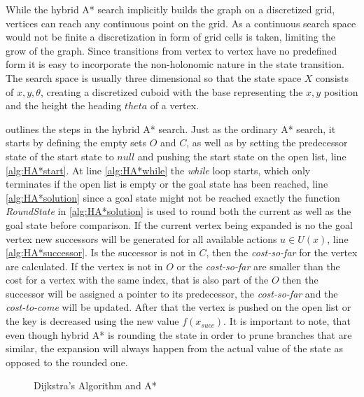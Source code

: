 While the hybrid A* search implicitly builds the graph on a discretized grid, vertices can reach any continuous point on the grid. As a continuous search space would not be finite a discretization in form of grid cells is taken, limiting the grow of the graph. Since transitions from vertex to vertex have no predefined form it is easy to incorporate the non-holonomic nature in the state transition. The search space is usually three dimensional so that the state space $X$ consists of $x,y,\theta$, creating a discretized cuboid with the base representing the $x,y$ position and the height the heading $theta$ of a vertex.

 outlines the steps in the hybrid A* search. Just as the ordinary A* search, it starts by defining the empty sets $O$ and $C$, as well as by setting the predecessor state of the start state to $null$ and pushing the start state on the open list, line \ref{alg:HA*start}. At line \ref{alg:HA*while} the \textit{while} loop starts, which only terminates if the open list is empty or the goal state has been reached, line \ref{alg:HA*solution} since a goal state might not be reached exactly the function \textit{RoundState} in \ref{alg:HA*solution} is used to round both the current as well as the goal state before comparison.
If the current vertex being expanded is no the goal vertex new successors will be generated for all available actions $u  \in U(x)$, line \ref{alg:HA*successor}. Is the successor is not in $C$, then the \textit{cost-so-far} for the vertex are calculated. If the vertex is not in $O$ or the \textit{cost-so-far} are smaller than the cost for a vertex with the same index, that is also part of the $O$ then the successor will be assigned a pointer to its predecessor, the \textit{cost-so-far} and the \textit{cost-to-come} will be updated. After that the vertex is pushed on the open list or the key is decreased using the new value $f(x_{succ})$.
It is important to note, that even though hybrid A* is rounding the state in order to prune branches that are similar, the expansion will always happen from the actual value of the state as opposed to the rounded one.

\begin{figure}[h]
    \caption{Dijkstra's Algorithm and A*}
    \label{fig:searchComparison}
\end{figure}


